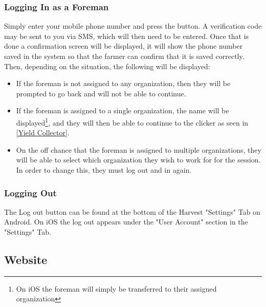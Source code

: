 \documentclass[11pt]{article}
\begin{document}
\subsubsection{Logging In as a Foreman}

Simply enter your mobile phone number and press the button. A verification code may be sent to you via SMS, which will then need to be entered. Once that is done a confirmation screen will be displayed, it will show the phone number saved in the system so that the farmer can confirm that it is saved correctly. Then, depending on the situation, the following will be displayed:
\begin{itemize}
 \item If the foreman is not assigned to any organization, then they will be prompted to go back and will not be able to continue.
 \item If the foreman is assigned to a single organization, the name will be displayed\footnote{On iOS the foreman will simply be transferred to their assigned organization}, and they will then be able to continue to the clicker as seen in \ref{Yield Collector}.
 \item On the off chance that the foreman is assigned to multiple organizations, they will be able to select which organization they wish to work for for the session. In order to change this, they must log out and in again.
\end{itemize}

\subsubsection{Logging Out}
The Log out button can be found at the bottom of the Harvest "Settings" Tab on Android. On iOS the log out appears under the "User Account" section in the "Settings" Tab.

\subsection{Website}

%
%
\end{document}

